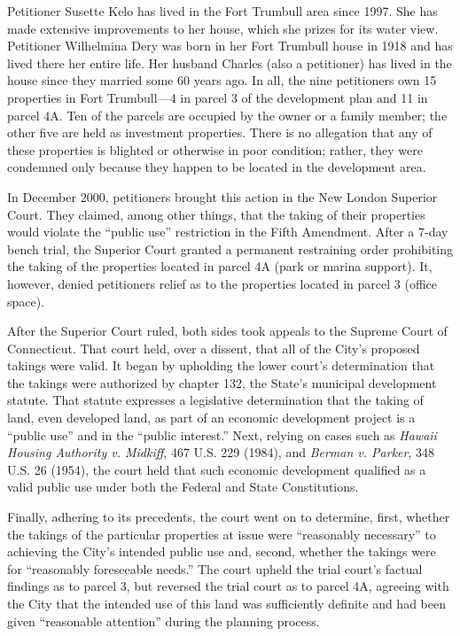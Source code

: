 Petitioner Susette Kelo has lived in the Fort Trumbull area since 1997. She has
made extensive improvements to her house, which she prizes for its water view.
Petitioner Wilhelmina Dery was born in her Fort Trumbull house in 1918 and has
lived there her entire life. Her husband Charles (also a petitioner) has lived
in the house since they married some 60 years ago. In all, the nine petitioners
own 15 properties in Fort Trumbull---4 in parcel 3 of the development plan and
11 in parcel 4A. Ten of the parcels are occupied by the owner or a family
member; the other five are held as investment properties. There is no allegation
that any of these properties is blighted or otherwise in poor condition; rather,
they were condemned only because they happen to be located in the development
area.

In December 2000, petitioners brought this action in the New London Superior
Court. They claimed, among other things, that the taking of their properties
would violate the ``public use'' restriction in the Fifth Amendment. After a
7-day bench trial, the Superior Court granted a permanent restraining order
prohibiting the taking of the properties located in parcel 4A (park or marina
support). It, however, denied petitioners relief as to the properties located in
parcel 3 (office space). 

After the Superior Court ruled, both sides took appeals to the Supreme Court of
Connecticut. That court held, over a dissent, that all of the City's proposed
takings were valid. It began by upholding the lower court's determination that
the takings were authorized by chapter 132, the State's municipal development
statute. That statute expresses a legislative determination that the taking of
land, even developed land, as part of an economic development project is a
``public use'' and in the ``public interest.'' Next, relying on cases such as
\textit{Hawaii Housing Authority v. Midkiff}, 467 U.S. 229 (1984), and
\textit{Berman v. Parker}, 348 U.S. 26 (1954), the court held that such economic
development qualified as a valid public use under both the Federal and State
Constitutions. 

Finally, adhering to its precedents, the court went on to determine, first,
whether the takings of the particular properties at issue were ``reasonably
necessary'' to achieving the City's intended public use and, second, whether the
takings were for ``reasonably foreseeable needs.'' The court upheld the trial
court's factual findings as to parcel 3, but reversed the trial court as to
parcel 4A, agreeing with the City that the intended use of this land was
sufficiently definite and had been given ``reasonable attention'' during the
planning process. 

